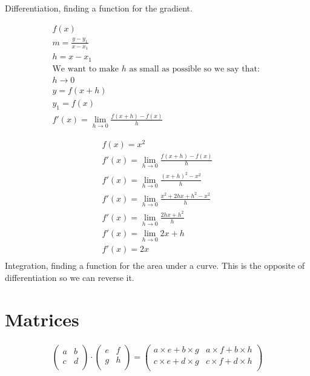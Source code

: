 \documentclass{article}
\begin{document}
Differentiation, finding a function for the gradient.

\begin{gather*}
	f(x)\\
	m = \frac{y - y_1}{x - x_1}\\
	h = x - x_1 \\
	\text{We want to make $h$ as small as possible so we say that: }\\
	h \to 0 \\
	y = f(x + h) \\
	y_1 = f(x) \\
	f'(x) = \lim_{h \to 0} \frac{f(x + h) - f(x)}{h}
\end{gather*}

\begin{gather*}
	f(x) = x^2 \\
	f'(x) = \lim_{h \to 0} \frac{f(x + h) - f(x)}{h} \\
	f'(x) = \lim_{h \to 0} \frac{(x + h)^2 - x^2}{h} \\
	f'(x) = \lim_{h \to 0} \frac{x^2 + 2hx + h^2 - x^2}{h} \\
	f'(x) = \lim_{h \to 0} \frac{2hx + h^2}{h} \\
	f'(x) = \lim_{h \to 0} 2x + h \\
	f'(x) = 2x \\
\end{gather*}
Integration, finding a function for the area under a curve.
This is the opposite of differentiation so we can reverse it.


\section{Matrices}

\begin{gather*}
	\begin{pmatrix}
		a & b \\
		c & d \\
	\end{pmatrix} \cdot \begin{pmatrix}
		e & f \\
		g & h \\
	\end{pmatrix} = \begin{pmatrix}
		a \times e + b \times g & a \times f + b \times h \\
		c \times e + d \times g & c \times f + d \times h \\
	\end{pmatrix}
\end{gather*}
\end{document}
